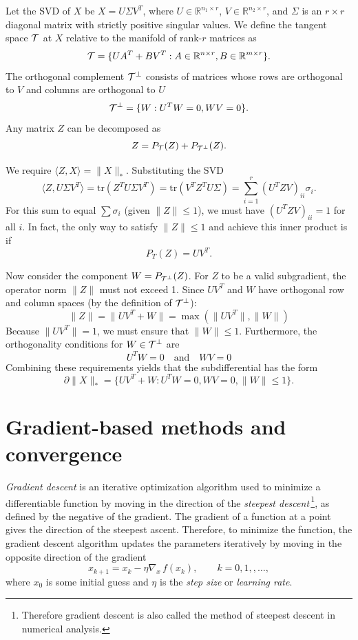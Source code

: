 Let the SVD of $X$ be $X = U \Sigma V^T$, where $U \in \mathbb{R}^{n_1 \times r}$, $V \in \mathbb{R}^{n_2 \times r}$, and $\Sigma$ is an $r \times r$ diagonal matrix with strictly positive singular values.
We define the tangent space $\mathcal{T}$ at $X$ relative to the manifold of rank-$r$ matrices as
$$\mathcal{T} = \{ U A^T + B V^T : A \in \mathbb{R}^{n \times r}, B \in \mathbb{R}^{m \times r} \}.$$
The orthogonal complement $\mathcal{T}^{\perp}$ consists of matrices whose rows are orthogonal to $V$ and columns are orthogonal to $U$
$$\mathcal{T}^{\perp} = \{ W : U^T W = 0, W V = 0 \}.$$
Any matrix $Z$ can be decomposed as
$$Z = P_{\mathcal{T}}(Z) + P_{\mathcal{T}^\perp}(Z).$$

We require $\langle Z, X \rangle = \|X\|_*$. Substituting the SVD
$$\langle Z, U \Sigma V^T \rangle = \text{tr}(Z^T U \Sigma V^T) = \text{tr}(V^T Z^T U \Sigma) =  \sum_{i=1}^r (U^T Z V)_{ii} \sigma_i.$$
For this sum to equal $\sum \sigma_i$ (given $\|Z\| \leq 1$), we must have $(U^T Z V)_{ii} = 1$ for all $i$. In fact, the only way to satisfy $\|Z\| \leq 1$ and achieve this inner product is if
$$P_T(Z) = UV^T.$$

Now consider the component $W = P_{\mathcal{T}^\perp}(Z)$. For $Z$ to be a valid subgradient, the operator norm $\|Z\|$ must not exceed 1. Since $UV^T$ and $W$ have orthogonal row and column spaces (by the definition of $\mathcal{T}^\perp$):
$$\|Z\| = \|UV^T + W\| = \max(\|UV^T\|, \|W\|)$$
Because $\|UV^T\| = 1$, we must ensure that $\|W\| \leq 1$.
Furthermore, the orthogonality conditions for $W \in \mathcal{T}^\perp$ are
$$U^T W = 0 \quad \text{and} \quad WV = 0$$
Combining these requirements yields that the subdifferential has the form
\begin{equation}\label{eq:nuclearsubdifferential}
\partial \|X\|_* = \{ UV^T + W : U^T W = 0, WV = 0, \|W\| \leq 1 \}.
\end{equation}


 


\section{Gradient-based methods and convergence} 
\label{s:grad}





{\em Gradient descent} is an iterative optimization algorithm used to minimize a differentiable function by moving in the direction of the {\em steepest descent}\,\footnote{Therefore gradient descent is also called the method of steepest descent in numerical analysis.}, as defined by the negative of the gradient. The gradient of a function at a point gives the direction of the steepest ascent. Therefore, to minimize the function, the gradient descent algorithm updates the parameters iteratively by moving in the opposite direction of the gradient
\begin{equation}
x_{k+1} = x_{k} - \eta \nabla_{\! x} \, f(x_k),  \qquad k=0,1,,\dots,
\label{gradientdescent}
\end{equation}
where $x_{0}$ is some initial guess and $\eta $ is the {\em step size} or {\em learning rate}.

